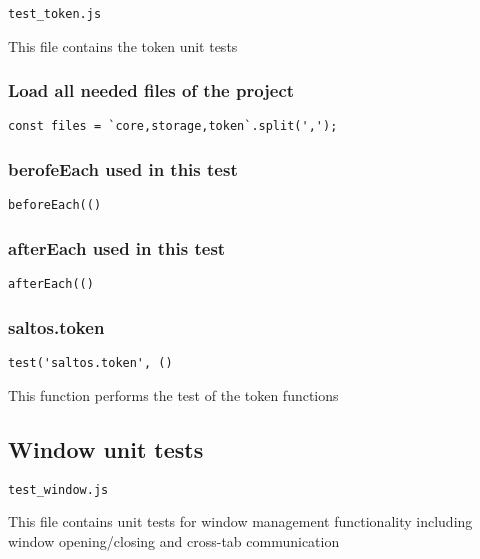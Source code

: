 \documentclass[a4paper]{article}
\begin{document}
\begin{lstlisting}
test_token.js
\end{lstlisting}

This file contains the token unit tests

\hypertarget{toc277}{}
\subsubsection{Load all needed files of the project}

\begin{lstlisting}
const files = `core,storage,token`.split(',');
\end{lstlisting}

\hypertarget{toc278}{}
\subsubsection{berofeEach used in this test}

\begin{lstlisting}
beforeEach(()
\end{lstlisting}

\hypertarget{toc279}{}
\subsubsection{afterEach used in this test}

\begin{lstlisting}
afterEach(()
\end{lstlisting}

\hypertarget{toc280}{}
\subsubsection{saltos.token}

\begin{lstlisting}
test('saltos.token', ()
\end{lstlisting}

This function performs the test of the token functions

\hypertarget{toc281}{}
\subsection{Window unit tests}

\begin{lstlisting}
test_window.js
\end{lstlisting}

This file contains unit tests for window management functionality
including window opening/closing and cross-tab communication
\end{document}
